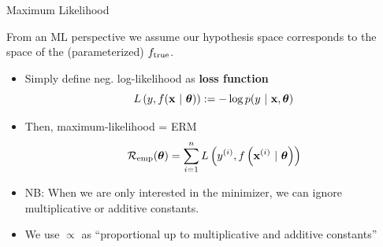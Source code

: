 \documentclass[11pt,compress,t,notes=noshow, xcolor=table]{beamer}
\begin{document}
\begin{vbframe}{Maximum Likelihood}
\framebreak 

From an ML perspective we assume our hypothesis space corresponds to the space of the (parameterized) $f_{\text{true}}$. 

\begin{itemize}
\item Simply define neg. log-likelihood as \textbf{loss function} 
$$ L\left(y, f(\mathbf{x} ~|~ \bm{\theta})\right) := - \log p(y ~|~\mathbf{x}, \bm{\theta}) $$
\item Then, maximum-likelihood 
 = ERM
$$\mathcal{R}_{\text{emp}}(\bm{\theta}) = \sum\limits_{i=1}^n L\left(y^{(i)}, f\left(\mathbf{x}^{(i)} ~|~ \bm{\theta}\right)\right)$$

\item NB: When we are only interested in the minimizer, we can ignore multiplicative or additive constants.
\item We use $\propto$ as \enquote{proportional up to multiplicative and additive constants}

\end{itemize}

\end{vbframe}
\end{document}
